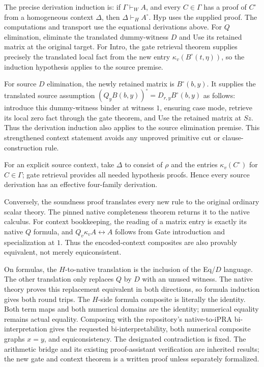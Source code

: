 \documentclass[11pt]{article}
\theoremstyle{definition}\newtheorem{definition}[theorem]{Definition}
\theoremstyle{remark}\newtheorem{remark}[theorem]{Remark}
\begin{document}
The precise derivation induction is: if $\Gamma\vdash_W A$, and every
$C\in\Gamma$ has a proof of $C^\circ$ from a homogeneous context
$\Delta$, then $\Delta\vdash_H A^\circ$.  Hyp uses the supplied proof.
The computations and transport use the equational derivations above.
For $Q$ elimination, eliminate the translated dummy-witness $D$ and Use
its retained matrix at the original target.  For Intro, the gate
retrieval theorem supplies precisely the translated local fact from the
new entry $\kappa_v(B^\circ(t,\eta))$, so the induction hypothesis
applies to the source premise.

For source $D$ elimination, the newly retained matrix is
$B^\circ(b,y)$.  It supplies the translated source assumption
$(Q_yB(b,y))^\circ=D_{r,y}B^\circ(b,y)$ as follows: introduce this
dummy-witness binder at witness $1$, ensuring case mode, retrieve its
local zero fact through the gate theorem, and Use the retained matrix at
$Sz$.  Thus the derivation induction also applies to the source
elimination premise.  This strengthened context statement avoids any
unproved primitive cut or clause-construction rule.

For an explicit source context, take $\Delta$ to consist of $\rho$ and
the entries $\kappa_v(C^\circ)$ for $C\in\Gamma$; gate retrieval
provides all needed hypothesis proofs.  Hence every source derivation
has an effective four-family derivation.

Conversely, the soundness proof translates every new rule to the original
ordinary scalar theory.  The pinned native completeness theorem returns
it to the native calculus.  For context bookkeeping, the reading of a
matrix entry is exactly its native $Q$ formula, and
$Q_v\kappa_vA\leftrightarrow A$ follows from Gate introduction and
specialization at $1$.  Thus the encoded-context composites are also
provably equivalent, not merely equiconsistent.

On formulas, the $H$-to-native translation is the inclusion of the
Eq/$D$ language.  The other translation only replaces $Q$ by $D$ with
an unused witness.  The native theory proves this replacement
equivalent in both directions, so formula induction gives both
round trips.  The $H$-side formula composite is literally the identity.
Both term maps and both numerical domains are the identity; numerical
equality remains actual equality.  Composing with the repository's
native-to-iPRA bi-interpretation gives the requested bi-interpretability,
both numerical composite graphs $x=y$, and equiconsistency.  The
designated contradiction is fixed.  The arithmetic bridge and its
existing proof-assistant verification are inherited results; the new
gate and context theorem is a written proof unless separately formalized.
\end{document}
